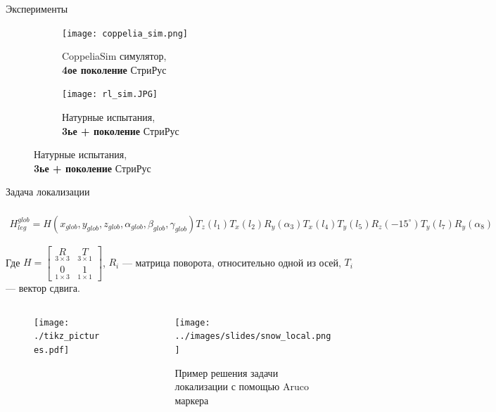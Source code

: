 \begin{frame}[t]{Эксперименты}
    \begin{figure}[H]
        \begin{subfigure}[t]{0.49\textwidth}
            \centering\texttt{[image: coppelia\_sim.png]}
            \caption*{CoppeliaSim симулятор,\\ \textbf{4ое поколение} СтриРус}
        \end{subfigure}
        \begin{subfigure}[t]{0.49\textwidth}
            \centering\texttt{[image: rl\_sim.JPG]}
            \caption*{Натурные испытания,\\ \textbf{3ье + поколение} СтриРус}
        \end{subfigure}
    \end{figure}
\end{frame}

\begin{frame}[t]{Задача локализации}
\framesubtitle{}
\begin{multline}
        H_{leg}^{glob} = H(x_{glob},y_{glob},z_{glob},\alpha_{glob},\beta_{glob},\gamma_{glob})T_z(l_1)T_x(l_2)R_y(\alpha_3)T_x(l_4)T_y(l_5)R_z(-15^{\circ})T_y(l_7)R_y(\alpha_8)
\end{multline}

\vspace{-0.3cm}
Где $H = \begin{bmatrix}
    \underset{3 \times 3}{R} & \underset{3 \times 1}{T} \\
    \underset{1 \times 3}{0} & \underset{1 \times 1}{1}
\end{bmatrix}$, $R_i$ --- матрица поворота, относительно одной из осей, $T_i$ --- вектор сдвига.

    \begin{columns}[T,onlytextwidth]
        \begin{column}{0.69\textwidth}
            
            \vspace{-0.3cm}
            \begin{figure}[H]
        \centering
        \centering\texttt{[image: ./tikz\_pictures.pdf]}
    \end{figure}
        \end{column}
        \begin{column}{0.29\textwidth}
            \begin{figure}[H]
                \centering\texttt{[image: ../images/slides/snow\_local.png]}
                \caption{Пример решения задачи локализации с помощью Aruco маркера}
            \end{figure}
        \end{column}
    \end{columns}
\end{frame}


